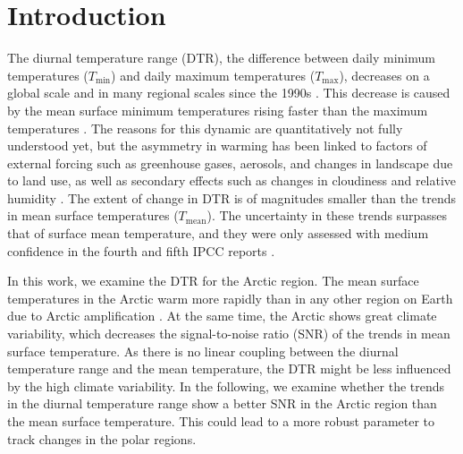 

\chapter{Introduction}
\label{chap:einleitung}
 
The diurnal temperature range (DTR), the difference between daily minimum temperatures ($T_{\mathrm{min}}$) and daily maximum temperatures ($T_{\mathrm{max}}$), decreases on a global scale and in many regional scales since the 1990s \cite{Easterling.1997,Karl.1993,Alexander.2006}. This decrease is caused by the mean surface minimum temperatures rising faster than the maximum temperatures \cite{Karl.1993}. The reasons for this dynamic are quantitatively not fully understood yet, but the asymmetry in warming has been linked to factors of external forcing such as greenhouse gases, aerosols, and changes in landscape due to land use, as well as secondary effects such as changes in cloudiness and relative humidity \cite[text]{Zhou.2010,Lewis.2013,Liu.2016,Christidis.2016}. The extent of change in DTR is of magnitudes smaller than the trends in mean surface temperatures ($T_{\mathrm{mean}}$). The uncertainty in these trends surpasses that of surface mean temperature, and they were only assessed with medium confidence in the fourth and fifth IPCC reports \cite{.2014}.

In this work, we examine the DTR for the Arctic region. The mean surface temperatures in the Arctic warm more rapidly than in any other region on Earth due to Arctic amplification \cite{Pithan.2014}. At the same time, the Arctic shows great climate variability, which decreases the signal-to-noise ratio (SNR) of the trends in mean surface temperature\cite{Hartmuth.2023}. As there is no linear coupling between the diurnal temperature range and the mean temperature, the DTR might be less influenced by the high climate variability. In the following, we examine whether the trends in the diurnal temperature range show a better SNR in the Arctic region than the mean surface temperature. This could lead to a more robust parameter to track changes in the polar regions.

